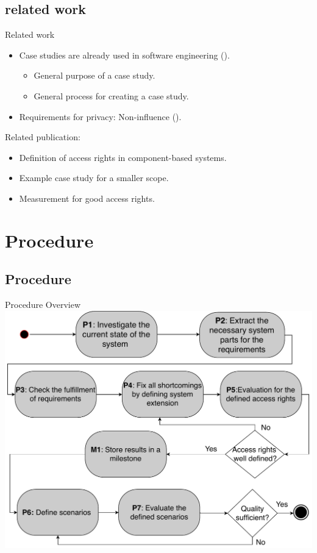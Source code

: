\documentclass[18pt]{beamer}
\begin{document}
\subsection{related work}
\begin{frame}{Related work}
\begin{itemize}
\item Case studies are already used in software engineering (\cite{CSCS}).
\begin{itemize}
\item General purpose of a case study.
\item General process for creating a case study.
\end{itemize}
\pause
\item Requirements for privacy: Non-influence (\cite{Noninfluence}).
\end{itemize}
\pause

\begin{block}{Related publication: \cite{CaseStudyAndAccessrigths}} 
\begin{itemize}
\item Definition of access rights in component-based systems.
\item Example case study for a  smaller scope.
\item Measurement for good access rights.
\end{itemize}
\end{block}

\end{frame}

\section{Procedure}

\subsection{Procedure}
\begin{frame}{Procedure Overview}
\centering
\includegraphics[scale=.45]{logos/Procedure.pdf}
\end{frame}
\end{document}

